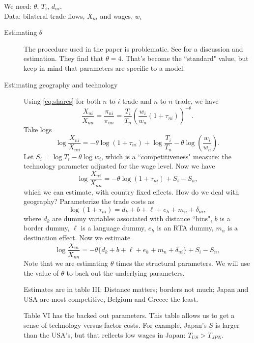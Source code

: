 \documentclass[11pt, pdftex]{article}
\begin{document}
We need: $\theta$, $T_i$, $d_{ni}$. \\
Data: bilateral trade flows, $X_{ni}$ and wages, $w_i$
\begin{description}
  \item[Estimating $\theta$] The procedure used in the paper is problematic.  See \citet{simonovskaWaugh} for a discussion and estimation.  They find that $\theta=4$. That's become the ``standard" value, but keep in mind that parameters are specific to a model.
  \item[Estimating geography and technology] Using \eqref{eq:shares} for both $n$ to $i$ trade and $n$ to $n$ trade, we have
      \begin{equation}
        \frac{X_{ni}}{X_{nn}}=\frac{\pi_{ni}}{\pi_{nn}}=\frac{T_i}{T_n}\left(\frac{w_i}{w_n}(1+\tau_{ni})\right)^{-\theta}.
      \end{equation}
      Take logs
      \begin{equation}
        \log\frac{X_{ni}}{X_{nn}}=-\theta\log(1+\tau_{ni})+\log\frac{T_i}{T_n} -\theta\log\left(\frac{w_i}{w_n}\right).
      \end{equation}
      Let $S_i=\log T_i-\theta \log w_i$, which is a ``competitiveness" measure: the technology parameter adjusted for the wage level. Now we have
      \begin{equation}
        \log\frac{X_{ni}}{X_{nn}}=-\theta\log(1+\tau_{ni})+S_i-S_n,
      \end{equation}
      which we can estimate, with country fixed effects. How do we deal with geography?  Parameterize the trade costs as
      \begin{equation}
        \log(1+\tau_{ni})=d_k+b+\ell+e_h+m_n+\delta_{ni},
      \end{equation}
      where $d_k$ are dummy variables associated with distance ``bins", $b$ is a border dummy, $\ell$ is a language dummy, $e_h$ is an RTA dummy, $m_n$ is a destination effect.  Now we estimate
      \begin{equation}
        \log\frac{X_{ni}}{X_{nn}}=-\theta\{d_k+b+\ell+e_h+m_n+\delta_{ni}\}+S_i-S_n,
      \end{equation}
      Note that we are estimating $\theta$ times the structural parameters.  We will use the value of $\theta$ to back out the underlying parameters.

      Estimates are in table III: Distance matters; borders not much; Japan and USA are most competitive, Belgium and Greece the least.

      Table VI has the backed out parameters.  This table allows us to get a sense of technology versus factor costs.  For example, Japan's $S$ is larger than the USA's, but that reflects low wages in Japan: $T_{US} > T_{JPN}$.
\end{description}
\end{document}
